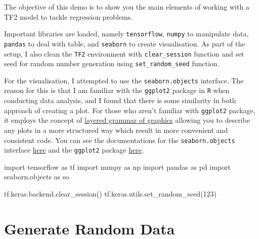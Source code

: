 \documentclass[
  letterpaper,
  DIV=11,
  numbers=noendperiod]{scrreprt}
\newenvironment{Shaded}{\begin{snugshade}}{\end{snugshade}}
\newcommand{\DecValTok}[1]{\textcolor[rgb]{0.68,0.00,0.00}{#1}}
\newcommand{\ImportTok}[1]{\textcolor[rgb]{0.00,0.46,0.62}{#1}}
\newcommand{\NormalTok}[1]{\textcolor[rgb]{0.00,0.23,0.31}{#1}}
\begin{document}
The objective of this demo is to show you the main elements of working
with a TF2 model to tackle regression problems.

Important libraries are loaded, namely \texttt{tensorflow},
\texttt{numpy} to manipulate data, \texttt{pandas} to deal with table,
and \texttt{seaborn} to create visualisation. As part of the setup, I
also clean the \texttt{TF2} environment with \texttt{clear\_session}
function and set seed for random number generation using
\texttt{set\_random\_seed} function.

For the visualisation, I attempted to use the \texttt{seaborn.objects}
interface. The reason for this is that I am familiar with the
\texttt{ggplot2} package in \texttt{R} when conducting data analysis,
and I found that there is some similarity in both approach of creating a
plot. For those who aren't familiar with \texttt{ggplot2} package, it
employs the concept of
\href{https://vita.had.co.nz/papers/layered-grammar.html}{layered
grammar of graphics} allowing you to describe any plots in a more
structured way which result in more convenient and consistent code. You
can see the documentations for the \texttt{seaborn.objects} interface
\href{https://seaborn.pydata.org/tutorial/objects_interface}{here} and
the \texttt{ggplot2} package
\href{https://ggplot2.tidyverse.org/}{here}.

\begin{Shaded}
\begin{Highlighting}[]
\ImportTok{import}\NormalTok{ tensorflow }\ImportTok{as}\NormalTok{ tf}
\ImportTok{import}\NormalTok{ numpy }\ImportTok{as}\NormalTok{ np}
\ImportTok{import}\NormalTok{ pandas }\ImportTok{as}\NormalTok{ pd}
\ImportTok{import}\NormalTok{ seaborn.objects }\ImportTok{as}\NormalTok{ so}
\end{Highlighting}
\end{Shaded}

\begin{Shaded}
\begin{Highlighting}[]
\NormalTok{tf.keras.backend.clear\_session()}
\NormalTok{tf.keras.utils.set\_random\_seed(}\DecValTok{123}\NormalTok{)}
\end{Highlighting}
\end{Shaded}

\hypertarget{generate-random-data}{%
\section{Generate Random Data}\label{generate-random-data}}
\end{document}

